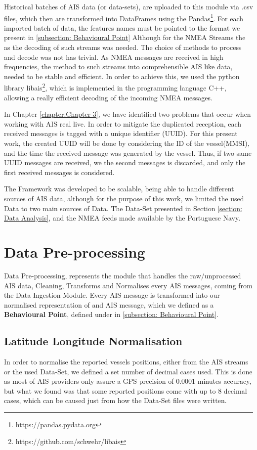 Historical batches of AIS data (or data-sets), are uploaded to this module via .csv files, which then are transformed into DataFrames using the Pandas\footnote{https://pandas.pydata.org}. For each imported batch of data, the features names must be pointed to the format we present in \ref{subsection: Behavioural Point}
Although for the NMEA Streams the as the decoding of such streams was needed. The choice of methods to process and decode was not has trivial. As NMEA messages are received in high frequencies, the method to such streams into comprehensible AIS like data, needed to be stable and efficient. In order to achieve this, we used the python library libais\footnote{https://github.com/schwehr/libais}, which is implemented in the programming language C++, allowing a really efficient decoding of the incoming NMEA messages. 

In Chapter \ref{chapter:Chapter 3}, we have identified two problems that occur when working with AIS real live. In order to mitigate the duplicated reception, each received messages is tagged with a unique identifier (UUID). For this present work, the created UUID will be done by considering the ID of the vessel(MMSI), and the time the received message was generated by the vessel. Thus, if two same UUID messages are received, we the second messages is discarded, and only the first received messages is considered.

The Framework was developed to be scalable, being able to handle different sources of AIS data, although for the purpose of this work, we limited the used Data to two main sources of Data. The Data-Set presented in Section \ref{section: Data Analysis}, and the NMEA feeds made available by the Portuguese Navy.


\section{Data Pre-processing}
Data Pre-processing, represents the module that handles the raw/unprocessed AIS data, Cleaning, Transforms and Normalises every AIS messages, coming from the Data Ingestion Module. Every AIS message is transformed into our normalised representation of and AIS message, which we defined as a \textbf{Behavioural Point}, defined under in \ref{subsection: Behavioural Point}.

\subsection{Latitude Longitude Normalisation}
In order to normalise the reported vessels positions, either from the AIS streams or the used Data-Set, we defined a set number of decimal cases used. This is done as most of AIS providers only assure a GPS precision of 0.0001 minutes accuracy, but what we found was that some reported positions come with up to 8 decimal cases, which can be caused just from how the Data-Set files were written.

